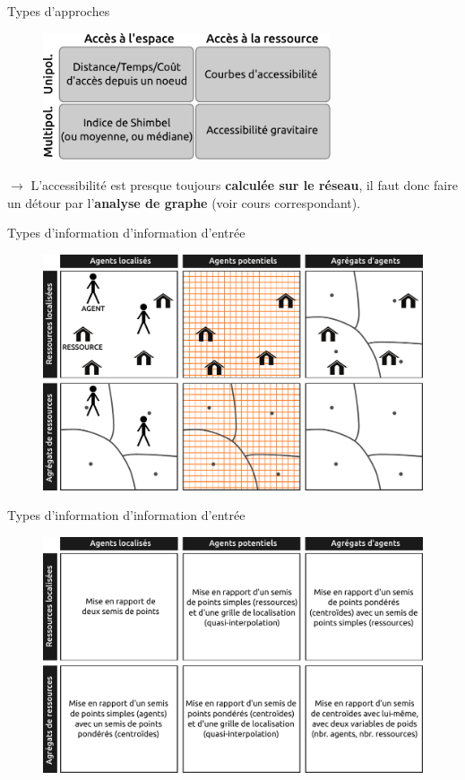 \begin{frame}{Types d'approches}

\begin{figure}
  \includegraphics[width=8.5cm]{QuatreAcces.pdf}
\end{figure}

$\rightarrow$ L'accessibilité est presque toujours \textbf{calculée sur le réseau}, il faut donc faire un détour par l'\textbf{analyse de graphe} (voir cours correspondant).


\end{frame}



\begin{frame}{Types d'information d'information d'entrée}

\begin{figure}
  \includegraphics[width=12cm]{Semis.pdf}
\end{figure}

\end{frame}


\begin{frame}{Types d'information d'information d'entrée}

\begin{figure}
  \includegraphics[width=12cm]{SemisExpliq.pdf}
\end{figure}

\end{frame}


